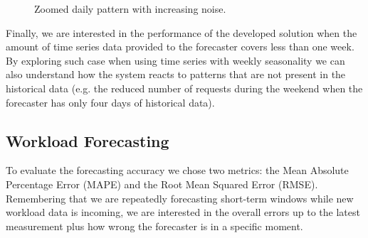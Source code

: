 \documentclass[a4paper, 12pt]{article} %
\begin{document}
	\begin{figure}\centering
		 \hfill
		
		\caption{Zoomed daily pattern with increasing noise.}
		\label{fig:daily_noises}
	\end{figure}
	
	Finally, we are interested in the performance of the developed solution when the amount of time series data provided to the forecaster covers less than one week. By exploring such case when using time series with weekly seasonality we can also understand how the system reacts to patterns that are not present in the historical data (e.g. the reduced number of requests during the weekend when the forecaster has only four days of historical data).
	
	\subsection{ Workload Forecasting } \label{ssec:exp_workload_forecasting}
	To evaluate the forecasting accuracy we chose two metrics: the Mean Absolute Percentage Error (MAPE) and the Root Mean Squared Error (RMSE).  Remembering that we are repeatedly forecasting short-term windows while new workload data is incoming, we are interested in the overall errors up to the latest measurement plus how wrong the forecaster is in a specific moment.
	
\end{document}
